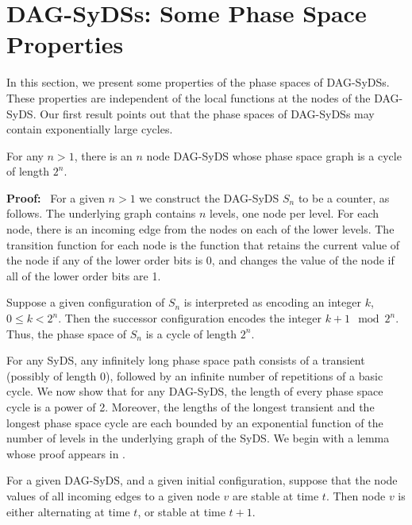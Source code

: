 \section{DAG-SyDSs: Some Phase Space Properties}
\label{sec:bounded-levels}

In this section, we present some properties of the
phase spaces of DAG-SyDSs.
These properties are independent of the local functions
at the nodes of the DAG-SyDS.
Our first result points out that the phase spaces
of DAG-SyDSs may contain exponentially large cycles.

\smallskip
\begin{proposition}\label{pro:long_phase_space_cycle}
For any $n  > 1$, there is an $n$ node DAG-SyDS 
whose phase space graph is a cycle of length $2^n$.
\end{proposition}

\noindent
\textbf{Proof:}~ 
For a given $n > 1$ we construct the DAG-SyDS $S_n$ to be a counter, as follows.
The underlying graph contains $n$ levels, one node per level. 
For each node, there is an incoming edge from the nodes on each of the lower levels.
The transition function for each node is the function 
that retains the current value of the node if any of the lower order bits is 0,
and changes the value of the node if all of the lower order bits are 1.

Suppose a given configuration of $S_n$ is interpreted as encoding
an integer $k$, $0 \leq k < 2^n$.  Then the successor configuration
encodes the integer $k + 1 \mod 2^n$.  Thus, the phase space of
$S_n$ is a cycle of length $2^n$.  \QED

\smallskip

For any SyDS, any infinitely long phase space path consists of a
transient (possibly of length 0), followed by an infinite number
of repetitions of a basic cycle.  We now show that for any 
DAG-SyDS, the length of every phase space cycle is a power of 2.
Moreover, the lengths of the longest transient and the longest phase
space cycle are each bounded by an exponential function of the
number of levels in the underlying graph of the SyDS.
We begin with a lemma whose proof appears in \cite{Rosenkrantz-etal-2020}.

\smallskip

\begin{lemma}\label{lem:all_inputs_stable}
For a given DAG-SyDS, and a given initial configuration, suppose
that the node values of all incoming edges to a given node $v$ are
stable at time $t$.  Then node $v$ is either alternating at time
$t$, or stable at time $t+1$.
\end{lemma}

